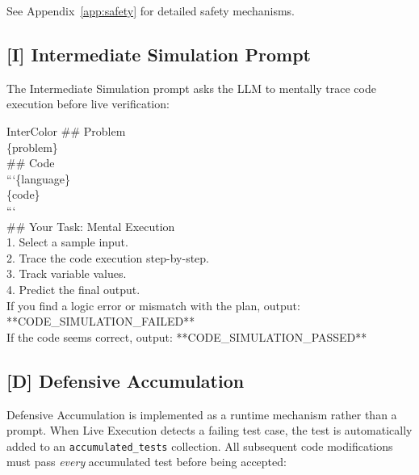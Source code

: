 \documentclass[11pt]{article}
\begin{document}
\noindent See Appendix~\ref{app:safety} for detailed safety mechanisms.

\subsection{[I] Intermediate Simulation Prompt}

The Intermediate Simulation prompt asks the LLM to mentally trace code execution before live verification:

\begin{promptbox}[title={\textcolor{white}{[I] Intermediate Simulation Prompt}}]{InterColor}
\small\ttfamily
\#\# Problem\\
\{problem\}\\[0.5em]
\#\# Code\\
```\{language\}\\
\{code\}\\
```\\[0.5em]
\#\# Your Task: Mental Execution\\
1. Select a sample input.\\
2. Trace the code execution step-by-step.\\
3. Track variable values.\\
4. Predict the final output.\\[0.5em]
If you find a logic error or mismatch with the plan, output: **CODE\_SIMULATION\_FAILED**\\
If the code seems correct, output: **CODE\_SIMULATION\_PASSED**
\end{promptbox}

\subsection{[D] Defensive Accumulation}

Defensive Accumulation is implemented as a runtime mechanism rather than a prompt. When Live Execution detects a failing test case, the test is automatically added to an \texttt{accumulated\_tests} collection. All subsequent code modifications must pass \textit{every} accumulated test before being accepted:
\end{document}
